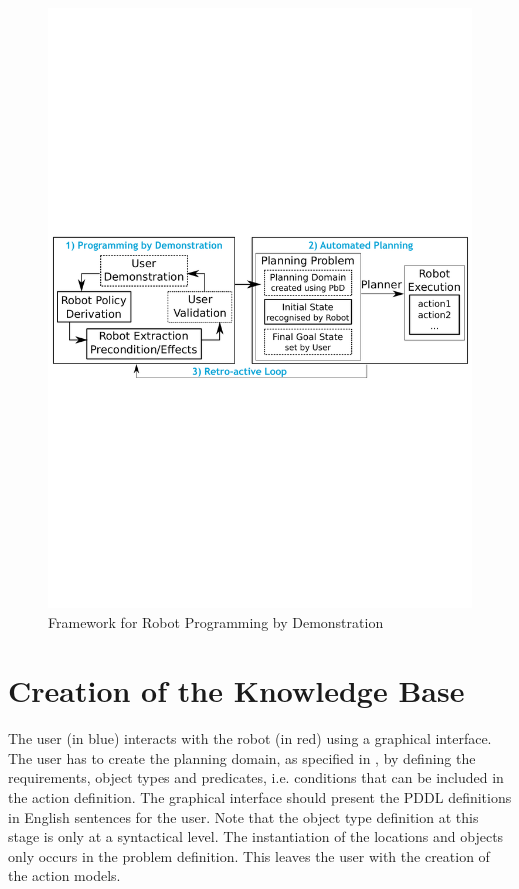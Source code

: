   \begin{figure}[!h]
    \centering
    \includegraphics[scale=0.66]{figures/framework2}
    \caption{Framework for Robot Programming by Demonstration}
    \label{fig:framework}
  \end{figure}

\section{Creation of the Knowledge Base}
The user (in blue) interacts with the robot (in red) using a graphical interface.
The user has to create the planning domain, as specified in , by defining the requirements, object types and predicates, i.e. conditions that can be included in the action definition.
The graphical interface should present the PDDL definitions in English sentences for the user.
Note that the object type definition at this stage is only at a syntactical level.
The instantiation of the locations and objects only occurs in the problem definition.
This leaves the user with the creation of the action models.

